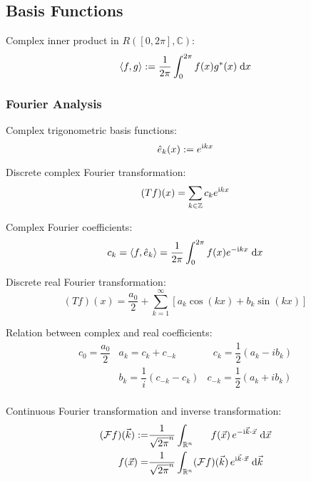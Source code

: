 	\subsection{Basis Functions}
		\noindent
		Complex inner product in $R([0,2\pi],\mathbb{C})$:
		\begin{equation}
			\left<f,g\right>:=\frac{1}{2\pi}\int_0^{2\pi} f(x)g^* (x)\;\mathrm{d} x
		\end{equation}

		\subsubsection{Fourier Analysis}
			\noindent
			Complex trigonometric basis functions:
			\begin{equation}
				\hat{e}_k(x):=e^{\mathrm{i} kx}
			\end{equation}

			\noindent
			Discrete complex Fourier transformation:
			\begin{equation}
				(Tf)(x)=\sum_{k\in\mathbb{Z}}c_k e^{\mathrm{i} kx}
			\end{equation}

			\noindent
			Complex Fourier coefficients:
			\begin{equation}
				c_k = \left<f,\hat{e}_k\right>=\frac{1}{2\pi}\int_0^{2\pi}f(x)e^{-\mathrm{i} kx}\;\mathrm{d} x
			\end{equation}

			\noindent
			Discrete real Fourier transformation:
			\begin{equation}
				(Tf)(x)=\frac{a_0}{2}+\sum_{k=1}^{\infty}\left[a_k \cos(kx) + b_k \sin(kx) \right]
			\end{equation}

			\noindent
			Relation between complex and real coefficients:
			\begin{equation}
				\begin{array}{clc}
					c_0 = \dfrac{a_0}{2} & a_k = c_k+c_{-k} & \phantom{_{-}}c_k = \dfrac{1}{2}\left(a_k-ib_k\right) \\ [6pt]
					& b_k = \dfrac{1}{i}\left(c_{-k}-c_{k}\right) & c_{-k} = \dfrac{1}{2}\left(a_k+ib_k\right) \\
				\end{array}
			\end{equation}

			\noindent
			Continuous Fourier transformation and inverse transformation:
			\begin{equation}
				\begin{aligned}
					(\mathcal{F}f)(\vec{k}) :=& \frac{1}{\sqrt{2\pi}^n}\int_{\mathbb{R}^n} \phantom{(\mathcal{F})}f(\vec{x})\, e^{-\i\vec{k}\cdot\vec{x}}\;\diff\vec{x} \\
					\phantom{(\mathcal{F})}f(\vec{x}) =& \frac{1}{\sqrt{2\pi}^n}\int_{\mathbb{R}^n} (\mathcal{F}f)(\vec{k}) \,e^{\i\vec{k}\cdot\vec{x}}\;\diff \vec{k} \\
				\end{aligned}
			\end{equation}

